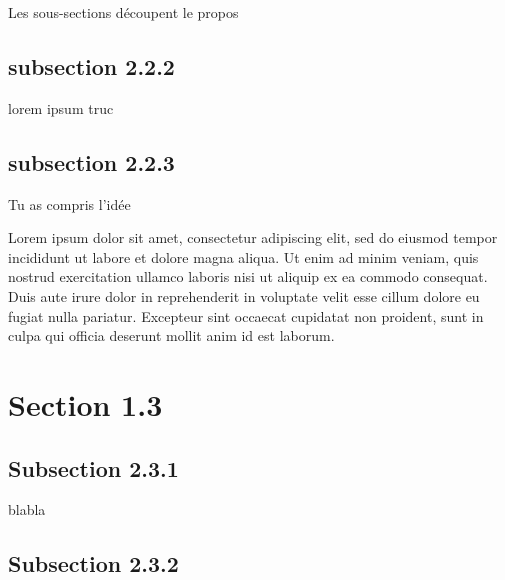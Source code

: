 Les sous-sections découpent le propos 
    
\subsection{subsection 2.2.2}

lorem ipsum truc

\subsection{subsection 2.2.3}

Tu as compris l'idée


\medskip
Lorem ipsum dolor sit amet, consectetur adipiscing elit, sed do eiusmod tempor incididunt ut labore et dolore magna aliqua. Ut enim ad minim veniam, quis nostrud exercitation ullamco laboris nisi ut aliquip ex ea commodo consequat. Duis aute irure dolor in reprehenderit in voluptate velit esse cillum dolore eu fugiat nulla pariatur. Excepteur sint occaecat cupidatat non proident, sunt in culpa qui officia deserunt mollit anim id est laborum.
\section{Section 1.3}

\subsection{Subsection 2.3.1}
blabla
\subsection{Subsection 2.3.2}


